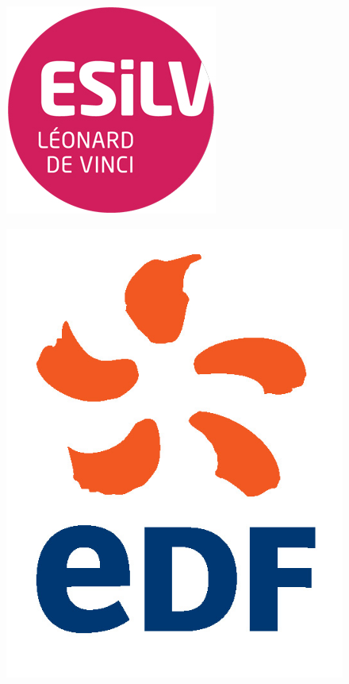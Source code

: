 \documentclass[12pt]{report}
\begin{document}
\begin{titlepage}

\newcommand{\HRule}{\rule{\linewidth}{0.5mm}} %

\begin{figure}
	\begin{minipage}[t]{.5\linewidth}
	\centering
	\includegraphics[scale=0.5]{esilv_logo.png}\\[1cm]
	\end{minipage}
	\begin{minipage}[t]{.5\linewidth}
	\includegraphics[scale=1.4]{edf_logo.png}\\[1cm]
	\end{minipage}
\end{figure}


\end{titlepage}
\end{document}
